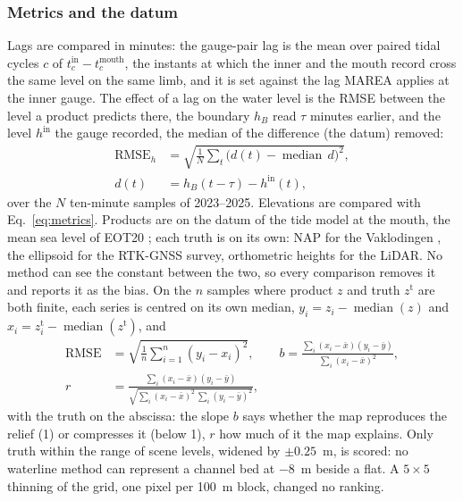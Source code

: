 \subsubsection{Metrics and the datum}

Lags are compared in minutes: the gauge-pair lag is the mean over
paired tidal cycles $c$ of $t^{\mathrm{in}}_c - t^{\mathrm{mouth}}_c$,
the instants at which the inner and the mouth record cross the same
level on the same limb, and it is set against the lag MAREA applies at
the inner gauge. The effect of a lag on the water level is the RMSE
between the level a product predicts there, the boundary $h_B$ read
$\tau$ minutes earlier, and the level $h^{\mathrm{in}}$ the gauge
recorded, the median of the difference (the datum) removed:
\begin{align}
\mathrm{RMSE}_h &= \sqrt{\frac{1}{N}\sum_{t}\big(d(t) - \operatorname{median}\,d\big)^{2}}, \nonumber \\
d(t) &= h_B(t - \tau) - h^{\mathrm{in}}(t),
\label{eq:judge}
\end{align}
over the $N$ ten-minute samples of 2023--2025. Elevations are compared
with Eq.~\eqref{eq:metrics}. Products are on the datum of the tide model at
the mouth, the mean sea level of EOT20 \cite{hartdavis2021}; each truth
is on its own: NAP for the Vaklodingen \cite{rws_vaklodingen}, the
ellipsoid for the RTK-GNSS survey, orthometric heights for the LiDAR. No
method can see the constant between the two, so every comparison removes
it and reports it as the bias. On the $n$ samples where product $z$ and
truth $z^{\mathrm{t}}$ are both finite, each series is centred on its own
median, $y_i = z_i - \operatorname{median}(z)$ and
$x_i = z^{\mathrm{t}}_i - \operatorname{median}(z^{\mathrm{t}})$, and
\begin{align}
\mathrm{RMSE} &= \sqrt{\frac{1}{n}\sum_{i=1}^{n}(y_i - x_i)^2}, \qquad
b = \frac{\sum_i (x_i-\bar x)(y_i-\bar y)}{\sum_i (x_i-\bar x)^2}, \nonumber \\
r &= \frac{\sum_i (x_i-\bar x)(y_i-\bar y)}
         {\sqrt{\sum_i (x_i-\bar x)^2\,\sum_i (y_i-\bar y)^2}},
\label{eq:metrics}
\end{align}
with the truth on the abscissa: the slope $b$ says whether the map
reproduces the relief (1) or compresses it (below 1), $r$ how much of it
the map explains. Only truth within the range of scene levels, widened
by $\pm 0.25$~m, is scored: no waterline method can represent a channel
bed at $-8$~m beside a flat. A $5 \times 5$ thinning of the grid, one
pixel per 100~m block, changed no ranking.

